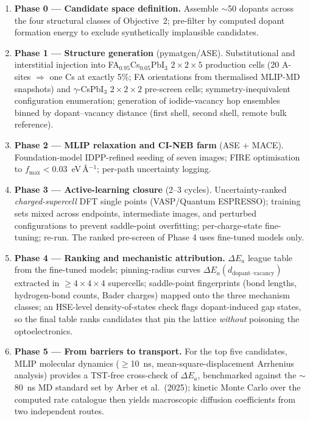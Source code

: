 \documentclass[11pt,a4paper]{article}
\begin{document}
\begin{enumerate}[leftmargin=1.6em]
\item \textbf{Phase 0 --- Candidate space definition.} Assemble $\sim$50 dopants
across the four structural classes of Objective~2; pre-filter by computed dopant
formation energy to exclude synthetically implausible candidates.

\item \textbf{Phase 1 --- Structure generation} (pymatgen/ASE). Substitutional and
interstitial injection into FA$_{0.95}$Cs$_{0.05}$PbI$_3$ $2\times2\times5$
production cells (20 A-sites $\Rightarrow$ one Cs at exactly 5\%; FA orientations
from thermalised MLIP-MD snapshots) and $\gamma$-CsPbI$_3$ $2\times2\times2$
pre-screen cells; symmetry-inequivalent configuration enumeration; generation of
iodide-vacancy hop ensembles binned by dopant--vacancy distance (first shell, second
shell, remote bulk reference).

\item \textbf{Phase 2 --- MLIP relaxation and CI-NEB farm} (ASE + MACE). Foundation-model
IDPP-refined seeding of seven images; FIRE optimisation to
$f_{\mathrm{max}} < 0.03$~eV\,\AA$^{-1}$; per-path uncertainty logging.

\item \textbf{Phase 3 --- Active-learning closure} (2--3 cycles). Uncertainty-ranked
\emph{charged-supercell} DFT single points (VASP/Quantum ESPRESSO); training sets mixed
across endpoints, intermediate images, and perturbed configurations to prevent
saddle-point overfitting; per-charge-state fine-tuning; re-run. The ranked pre-screen
of Phase 4 uses fine-tuned models only.

\item \textbf{Phase 4 --- Ranking and mechanistic attribution.} $\Delta E_a$ league
table from the fine-tuned models; pinning-radius curves
$\Delta E_a(d_{\mathrm{dopant\text{--}vacancy}})$ extracted in $\geq4\times4\times4$
supercells; saddle-point fingerprints (bond lengths, hydrogen-bond counts, Bader
charges) mapped onto the three mechanism classes; an HSE-level density-of-states check
flags dopant-induced gap states, so the final table ranks candidates that pin the
lattice \emph{without} poisoning the optoelectronics.

\item \textbf{Phase 5 --- From barriers to transport.} For the top five candidates,
MLIP molecular dynamics ($\geq$10~ns, mean-square-displacement Arrhenius analysis)
provides a TST-free cross-check of $\Delta E_a$, benchmarked against the $\sim$80~ns
MD standard set by Arber et al.\ (2025); kinetic Monte Carlo over the computed rate
catalogue then yields macroscopic diffusion coefficients from two independent routes.
\end{enumerate}
\end{document}
